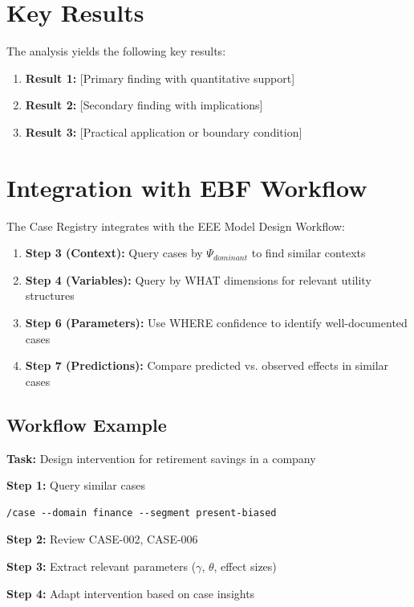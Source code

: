 \section{Key Results}
\label{sec:cas-results}

The analysis yields the following key results:

\begin{enumerate}
    \item \textbf{Result 1:} [Primary finding with quantitative support]
    \item \textbf{Result 2:} [Secondary finding with implications]
    \item \textbf{Result 3:} [Practical application or boundary condition]
\end{enumerate}


\section{Integration with EBF Workflow}

The Case Registry integrates with the EEE Model Design Workflow:

\begin{enumerate}
    \item \textbf{Step 3 (Context):} Query cases by $\Psi_{dominant}$ to find similar contexts
    \item \textbf{Step 4 (Variables):} Query by WHAT dimensions for relevant utility structures
    \item \textbf{Step 6 (Parameters):} Use WHERE confidence to identify well-documented cases
    \item \textbf{Step 7 (Predictions):} Compare predicted vs. observed effects in similar cases
\end{enumerate}

\subsection{Workflow Example}

\begin{tcolorbox}[colback=gray!5, colframe=gray!50]
\textbf{Task:} Design intervention for retirement savings in a company

\textbf{Step 1:} Query similar cases
\begin{verbatim}
/case --domain finance --segment present-biased
\end{verbatim}

\textbf{Step 2:} Review CASE-002, CASE-006

\textbf{Step 3:} Extract relevant parameters ($\gamma$, $\theta$, effect sizes)

\textbf{Step 4:} Adapt intervention based on case insights
\end{tcolorbox}


